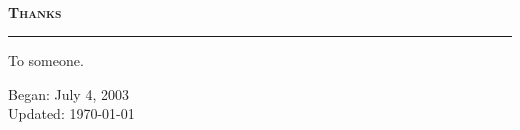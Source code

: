 	\newpage\noindent
	\textsc{}\
	\begin{spacing}{0}
		\begin{flushright}
			\textsc{\textbf{\Huge Thanks}}
			\rule{\textwidth}{.5pt}
		\end{flushright}	
	\end{spacing}
	\vspace{26pt}
	\thispagestyle{empty}
\noindent
To someone.\\

\vfill
\begin{flushright}
Began: July 4, 2003\\
Updated: \today\\
\end{flushright}